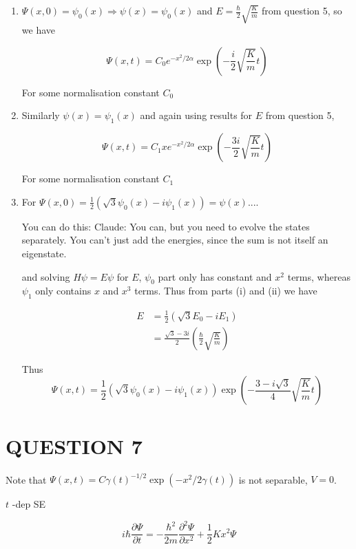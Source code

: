 \documentclass[a4paper]{article}
\begin{document}
\begin{enumerate}
	\item $ \Psi(x,0) = \psi_{0}(x) \Rightarrow \psi(x) = \psi_{0}(x)$ and $ E = \frac{\hbar}{2}\sqrt{\frac{K}{m}} $ from question 5, so we have 
	
	\[ \Psi(x,t) = C_{0} e^{-x^{2}/2\alpha} \exp\left( - \frac{i}{2}\sqrt{\frac{K}{m}} t \right)  \] 
	
	For some normalisation constant $ C_{0} $
	
	\item Similarly $ \psi(x) = \psi_{1}(x) $ and again using results for $ E $ from question 5,
	
	\[ \Psi(x,t) = C_{1} x e^{-x^{2}/2\alpha} \exp\left( - \frac{3i}{2}\sqrt{\frac{K}{m}} t \right)  \] 
	
	For some normalisation constant $ C_{1} $
	
	\item For $ \Psi(x,0)  = \frac{1}{2}  ( \sqrt{3} \psi_{0}(x) - i \psi_{1}(x)) = \psi(x) $....
	
	
	You can do this: Claude: You can, but you need to evolve the states separately. You can’t just add the energies, since the sum is not itself an eigenstate.
	
	 and solving $ H \psi = E \psi $ for $ E $, $ \psi_{0} $ part only has constant and $ x^{2} $ terms, whereas $ \psi_{1} $ only contains $ x $ and $ x^{3} $ terms. Thus from parts (i) and (ii) we have
	
	
	\begin{align*}
	E & = \frac{1}{2}(\sqrt{3} E_{0} - i E_{1} )  \\
	& = \frac{\sqrt{3} - 3i}{2} \left( \frac{\hbar}{2} \sqrt{\frac{K}{m}} \right) 
	\end{align*}
	
	Thus \[ \Psi(x,t) =  \frac{1}{2}  ( \sqrt{3} \psi_{0}(x) - i \psi_{1}(x)) \exp \left( - \frac{3 - i\sqrt{3}}{4} \sqrt{\frac{K}{m}} t   \right)  \]
 	
\end{enumerate}


\section{QUESTION 7}

Note that $ \Psi(x,t) = C \gamma(t)^{-1/2} \exp(-x^{2}/2\gamma(t)) $ is not separable, $ V = 0 $.


$ t $ -dep SE 

\[ i \hbar \frac{\partial \Psi }{\partial t} = - \frac{\hbar^{2}}{2m} \frac{\partial^{2} \Psi }{\partial x^{2}} + \frac{1}{2}Kx^{2} \Psi \]
\end{document}
